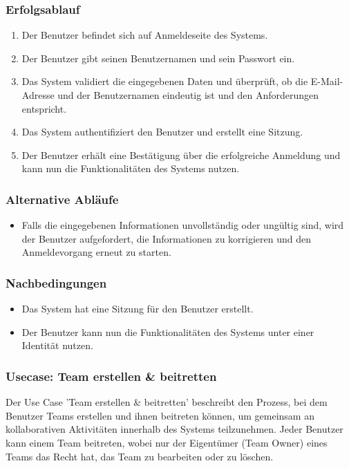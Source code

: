 \subsubsection*{Erfolgsablauf}

\begin{enumerate}
  \item Der Benutzer befindet sich auf Anmeldeseite des Systems.
  \item Der Benutzer gibt seinen Benutzernamen und sein Passwort ein.
  \item Das System validiert die eingegebenen Daten und überprüft, ob die E-Mail-Adresse und der Benutzernamen eindeutig ist und den Anforderungen entspricht.
  \item Das System authentifiziert den Benutzer und erstellt eine Sitzung.
  \item Der Benutzer erhält eine Bestätigung über die erfolgreiche Anmeldung und kann nun die Funktionalitäten des Systems nutzen.
\end{enumerate}

\subsubsection*{Alternative Abläufe}

\begin{itemize}
  \item Falls die eingegebenen Informationen unvollständig oder ungültig sind, wird der Benutzer aufgefordert, die Informationen zu korrigieren
   und den Anmeldevorgang erneut zu starten.
\end{itemize}

\subsubsection*{Nachbedingungen}

\begin{itemize}
  \item Das System hat eine Sitzung für den Benutzer erstellt.
  \item Der Benutzer kann nun die Funktionalitäten des Systems unter einer Identität nutzen.
\end{itemize}

\subsubsection{Usecase: Team erstellen \& beitretten}

Der Use Case 'Team erstellen \& beitretten' beschreibt den Prozess, bei dem Benutzer Teams erstellen und ihnen beitreten können, um gemeinsam an 
kollaborativen Aktivitäten innerhalb des Systems teilzunehmen. Jeder Benutzer kann einem Team beitreten, wobei nur der Eigentümer (Team Owner) eines 
Teams das Recht hat, das Team zu bearbeiten oder zu löschen.

